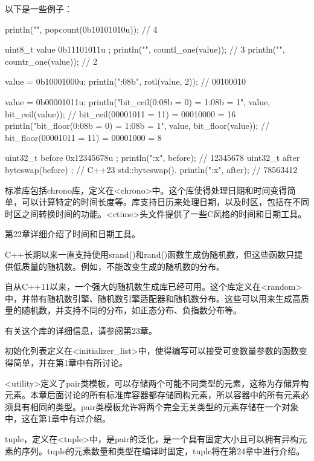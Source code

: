 以下是一些例子：

\begin{cpp}
println("{}", popcount(0b10101010u)); // 4

uint8_t value { 0b11101011u };
println("{}", countl_one(value)); // 3
println("{}", countr_one(value)); // 2

value = 0b10001000u;
println("{:08b}", rotl(value, 2)); // 00100010

value = 0b00001011u;
println("bit_ceil({0:08b} = {0}) = {1:08b} = {1}",
    value, bit_ceil(value)); // bit_ceil(00001011 = 11) = 00010000 = 16
println("bit_floor({0:08b} = {0}) = {1:08b} = {1}",
    value, bit_floor(value)); // bit_floor(00001011 = 11) = 00001000 = 8

uint32_t before { 0x12345678u };
println("{:x}", before); // 12345678
uint32_t after { byteswap(before) }; // C++23 std::byteswap().
println("{:x}", after); // 78563412
\end{cpp}


标准库包括chrono库，定义在<chrono>中。这个库使得处理日期和时间变得简单，可以计算特定的时间长度等。库支持日历来处理日期，以及时区，包括在不同时区之间转换时间的功能。<ctime>头文件提供了一些C风格的时间和日期工具。

第22章详细介绍了时间和日期工具。


C++长期以来一直支持使用srand()和rand()函数生成伪随机数，但这些函数只提供低质量的随机数。例如，不能改变生成的随机数的分布。

自从C++11以来，一个强大的随机数生成库已经可用。这个库定义在<random>中，并带有随机数引擎、随机数引擎适配器和随机数分布。这些可以用来生成高质量的随机数，并支持不同的分布，如正态分布、负指数分布等。

有关这个库的详细信息，请参阅第23章。


初始化列表定义在<initializer\_list>中，使得编写可以接受可变数量参数的函数变得简单，并在第1章中有所讨论。


<utility>定义了pair类模板，可以存储两个可能不同类型的元素，这称为存储异构元素。本章后面讨论的所有标准库容器都存储同构元素，所以容器中的所有元素必须具有相同的类型。pair类模板允许将两个完全无关类型的元素存储在一个对象中，这在第1章中有过介绍。

tuple，定义在<tuple>中，是pair的泛化，是一个具有固定大小且可以拥有异构元素的序列。tuple的元素数量和类型在编译时固定，tuple将在第24章中进行介绍。


